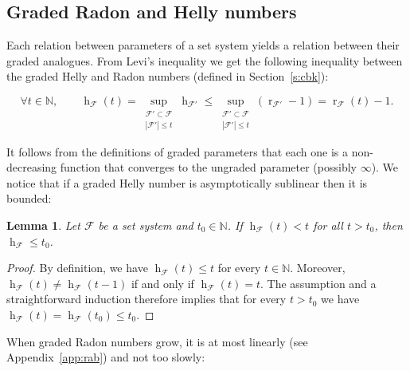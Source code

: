 \documentclass[a4paper,UKenglish,thm-restate]{article}
\newcommand{\N}{\mathbb{N}}
\newcommand{\F}{\mathcal{F}}
\DeclareMathOperator{\h}{h}
\DeclareMathOperator{\rad}{r}
\newcommand{\pth}[1]{\left(#1\right)}
\newtheorem{lemma}{Lemma}[section]
\begin{document}
\subsection{Graded Radon and Helly numbers}\label{s:graded1}


Each relation between parameters of a set system yields a relation between their graded analogues. From Levi's inequality we get the following inequality between the graded Helly and Radon numbers (defined in Section~\ref{s:cbk}):

\begin{equation}\label{eq:gradedhr}
  \forall t \in \N, \qquad \h_\F(t) =  \sup\limits_{\substack{\F'\subset \F \\ |\F'|\leq t}} \h_{\F'} \le \sup\limits_{\substack{\F'\subset \F \\ |\F'|\leq t}} \pth{\rad_{\F'}-1} = \rad_\F(t) - 1. 
\end{equation}

It follows from the definitions of graded parameters that each one is a non-decreasing function that converges to the ungraded parameter (possibly $\infty$). We notice that if a graded Helly number is asymptotically sublinear then it is bounded: 

\begin{lemma}\label{l:hellygrowth}
  Let $\F$ be a set system and $t_0 \in \N$. If $\h_\F(t) < t$ for all $t>t_0$, then $\h_\F \leq t_0$.
\end{lemma}
\begin{proof}
  By definition, we have $\h_\F(t) \le t$ for every $t \in \N$. Moreover, $\h_\F(t) \neq \h_\F(t-1)$ if and only if $\h_\F(t) = t$. The assumption and a straightforward induction therefore implies that for every $t>t_0$ we have $\h_\F(t) = \h_\F(t_0) \le t_0$.
\end{proof}

\noindent
When graded Radon numbers grow, it is at most linearly (see Appendix~\ref{app:rab}) and not too slowly:
\end{document}
